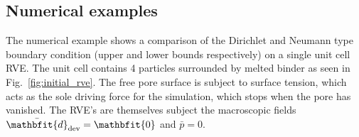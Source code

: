 \documentclass[notitlepage,a4paper,fleqn,9pt]{extarticle}
\renewcommand{\ta}[1]{\mathbfit{#1}}
\renewcommand{\ts}[1]{\mathbfit{#1}}
\renewcommand{\Box}{\mdlgwhtsquare}
\newcommand{\jump}[1]{[\![#1]\!]}
\newcommand{\Periodic}{\mathrm{P}}
\newcommand{\figref}[1]{Fig.~\ref{#1}}
\begin{document}
\begin{multicols}{2}

\section{Numerical examples}

The numerical example shows a comparison of the Dirichlet and Neumann type boundary condition (upper and lower bounds respectively) on a single unit cell RVE.
The unit cell contains 4 particles surrounded by melted binder as seen in \figref{fig:initial_rve}.
The free pore surface is subject to surface tension, which acts as the sole driving force for the simulation, which stops when the pore has vanished.
The RVE's are themselves subject the macroscopic fields $\bar{\ts d}_\dev = \ts 0$ and $\bar{p} = 0$.


\end{multicols}
\end{document}
